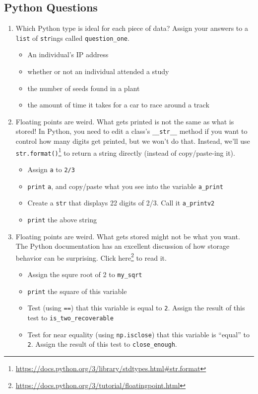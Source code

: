 \documentclass[
  12pt,
]{krantz}
\providecommand{\tightlist}{%
  \setlength{\itemsep}{0pt}\setlength{\parskip}{0pt}}
\renewcommand{\href}[2]{#2\footnote{\url{#1}}}
\begin{document}
\hypertarget{python-questions}{%
\subsection{Python Questions}\label{python-questions}}

\begin{enumerate}
\def\labelenumi{\arabic{enumi}.}
\item
  Which Python type is ideal for each piece of data? Assign your answers to a \texttt{list} of \texttt{str}ings called \texttt{question\_one}.

  \begin{itemize}
  \tightlist
  \item
    An individual's IP address
  \item
    whether or not an individual attended a study
  \item
    the number of seeds found in a plant
  \item
    the amount of time it takes for a car to race around a track
  \end{itemize}
\item
  Floating points are weird. What gets printed is not the same as what is stored! In Python, you need to edit a class's \texttt{\_\_str\_\_} method if you want to control how many digits get printed, but we won't do that. Instead, we'll use \href{https://docs.python.org/3/library/stdtypes.html\#str.format}{\texttt{str.format()}} to return a string directly (instead of copy/paste-ing it).

  \begin{itemize}
  \tightlist
  \item
    Assign \texttt{a} to \texttt{2/3}
  \item
    \texttt{print} \texttt{a}, and copy/paste what you see into the variable \texttt{a\_print}
  \item
    Create a \texttt{str} that displays 22 digits of 2/3. Call it \texttt{a\_printv2}
  \item
    \texttt{print} the above string
  \end{itemize}
\item
  Floating points are weird. What gets stored might not be what you want. The Python documentation has an excellent discussion of how storage behavior can be surprising. Click \href{https://docs.python.org/3/tutorial/floatingpoint.html}{here} to read it.

  \begin{itemize}
  \tightlist
  \item
    Assign the squre root of 2 to \texttt{my\_sqrt}
  \item
    \texttt{print} the square of this variable
  \item
    Test (using \texttt{==}) that this variable is equal to \texttt{2}. Assign the result of this test to \texttt{is\_two\_recoverable}
  \item
    Test for near equality (using \texttt{np.isclose}) that this variable is ``equal'' to \texttt{2}. Assign the result of this test to \texttt{close\_enough}.
  \end{itemize}
\end{enumerate}
\end{document}
